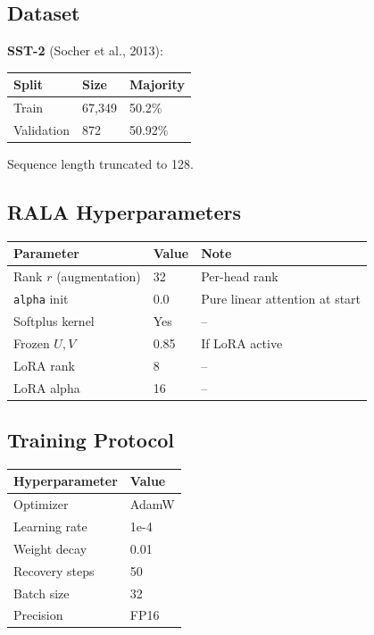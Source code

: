\subsection{Dataset}

\textbf{SST-2} (Socher et al., 2013):

\begin{table}[H]
\centering
\small
\begin{tabular}{lll}
\toprule
\textbf{Split} & \textbf{Size} & \textbf{Majority} \\
\midrule
Train & 67,349 & 50.2\% \\
Validation & 872 & 50.92\% \\
\bottomrule
\end{tabular}
\end{table}

Sequence length truncated to 128.

\subsection{RALA Hyperparameters}

\begin{table}[H]
\centering
\small
\begin{tabular}{lll}
\toprule
\textbf{Parameter} & \textbf{Value} & \textbf{Note} \\
\midrule
Rank $r$ (augmentation) & 32 & Per-head rank \\
\texttt{alpha} init & 0.0 & Pure linear attention at start \\
Softplus kernel & Yes & -- \\
Frozen $U, V$ & 0.85 & If LoRA active \\
LoRA rank & 8 & -- \\
LoRA alpha & 16 & -- \\
\bottomrule
\end{tabular}
\end{table}

\subsection{Training Protocol}

\begin{table}[H]
\centering
\small
\begin{tabular}{ll}
\toprule
\textbf{Hyperparameter} & \textbf{Value} \\
\midrule
Optimizer & AdamW \\
Learning rate & 1e-4 \\
Weight decay & 0.01 \\
Recovery steps & 50 \\
Batch size & 32 \\
Precision & FP16 \\
\bottomrule
\end{tabular}
\end{table}

